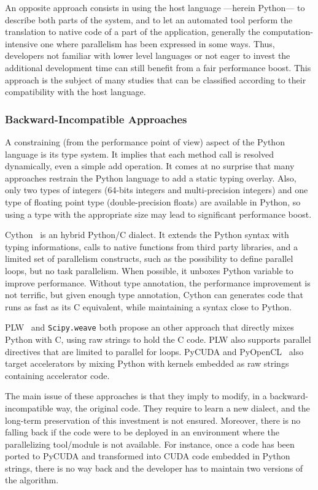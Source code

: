 \documentclass[conference]{IEEEtran}
\begin{document}
An opposite approach consists in using the host language ---herein Python--- to
describe both parts of the system, and to let an automated tool perform the
translation to native code of a part of the application, generally the
computation-intensive one where parallelism has been expressed in some ways.
Thus, developers not familiar with lower level languages or not eager to invest
the additional development time can still benefit from a fair performance boost.
This approach is the subject of many studies that can be classified according to
their compatibility with the host language.

\subsubsection{Backward-Incompatible Approaches}

A constraining (from the performance point of view) aspect of the Python
language is its type system. It implies that each method call is resolved
dynamically, even a simple add operation. It comes at no surprise that many
approaches restrain the Python language to add a static typing overlay.  Also,
only two types of integers (64-bits integers and multi-precision integers) and
one type of floating point type (double-precision floats) are available in
Python, so using a type with the appropriate size may lead to significant
performance boost.

Cython~\cite{cython2010} is an hybrid Python/C dialect. It extends the Python
syntax with typing informations, calls to native functions from third party
libraries, and a limited set of parallelism constructs, such as the possibility
to define parallel loops, but no task parallelism. When possible, it unboxes
Python variable to improve performance. Without type annotation, the performance
improvement is not terrific, but given enough type annotation, Cython can
generates code that runs as fast as its C equivalent, while maintaining a syntax
close to Python.

PLW~\cite{dongara2007} and \texttt{Scipy.weave} both propose an other approach
that directly mixes Python with C, using raw strings to hold the C code. PLW
also supports parallel directives that are limited to parallel for loops.
PyCUDA and PyOpenCL~\cite{klockner2012} also target accelerators by mixing
Python with kernels embedded as raw strings containing accelerator code.

The main issue of these approaches is that they imply to modify, in a
backward-incompatible way, the original code. They require to learn a new
dialect, and the long-term preservation of this investment is not ensured.
Moreover, there is no falling back if the code were to be deployed in an
environment where the parallelizing tool/module is not available. For instance,
once a code has been ported to PyCUDA and transformed into CUDA code embedded in
Python strings, there is no way back and the developer has to maintain two
versions of the algorithm.
\end{document}
